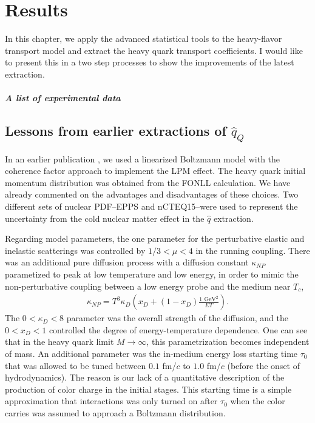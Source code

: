 \chapter{Results}
\label{chapter:results}
In this chapter, we apply the advanced statistical tools to the heavy-flavor transport model and extract the heavy quark transport coefficients.
I would like to present this in a two step processes to show the improvements of the latest extraction.

\paragraph{A list of experimental data}
\section{Lessons from earlier extractions of $\hat{q}_Q$}
In an earlier publication \cite{Ke:2018tsh}, we used a linearized Boltzmann model with the coherence factor approach to implement the LPM effect.
The heavy quark initial momentum distribution was obtained from the FONLL calculation.
We have already commented on the advantages and disadvantages of these choices.
Two different sets of nuclear PDF--EPPS and nCTEQ15--were used to represent the uncertainty from the cold nuclear matter effect in the $\hat{q}$ extraction.

Regarding model parameters, the one parameter for the perturbative elastic and inelastic scatterings was controlled by $1/3 < \mu < 4$ in the running coupling. 
There was an additional pure diffusion process with a diffusion constant $\kappa_{NP}$ parametized to peak at low temperature and low energy, in order to mimic the non-perturbative coupling between a low energy probe and the medium near $T_c$,
\begin{eqnarray}
\kappa_{NP} = T^3 \kappa_D \left(x_D + (1-x_D)\frac{1\textrm{ GeV}{}^2}{ET}\right).
\end{eqnarray}
The $0<\kappa_D<8$ parameter was the overall strength of the diffusion, and the $0<x_D<1$ controlled the degree of energy-temperature dependence.
One can see that in the heavy quark limit $M\rightarrow \infty$, this parametrization becomes independent of mass.
An additional parameter was the in-medium energy loss starting time $\tau_0$ that was allowed to be tuned between $0.1$ fm/$c$ to $1.0$ fm/$c$ (before the onset of hydrodynamics).
The reason is our lack of a quantitative description of the production of color charge in the initial stages.
This starting time is a simple approximation that interactions was only turned on after $\tau_0$ when the color carries was assumed to approach a Boltzmann distribution.


